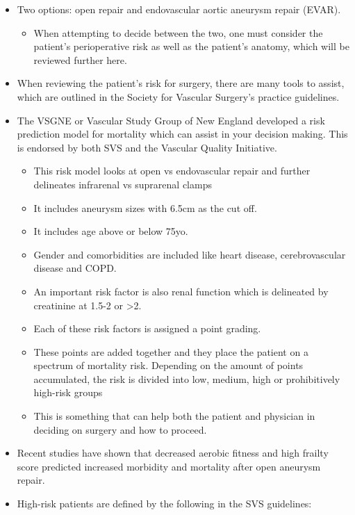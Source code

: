 \documentclass[
]{book}
\providecommand{\tightlist}{%
  \setlength{\itemsep}{0pt}\setlength{\parskip}{0pt}}
\begin{document}
\begin{itemize}
\item
  Two options: open repair and endovascular aortic aneurysm repair
  (EVAR).

  \begin{itemize}
  \tightlist
  \item
    When attempting to decide between the two, one must consider the
    patient's perioperative risk as well as the patient's anatomy,
    which will be reviewed further here.
  \end{itemize}
\item
  When reviewing the patient's risk for surgery, there are many tools
  to assist, which are outlined in the Society for Vascular Surgery's
  practice guidelines.
\item
  The VSGNE or Vascular Study Group of New England developed a risk
  prediction model for mortality which can assist in your decision
  making. This is endorsed by both SVS and the Vascular Quality
  Initiative.

  \begin{itemize}
  \item
    This risk model looks at open vs endovascular repair and further
    delineates infrarenal vs suprarenal clamps
  \item
    It includes aneurysm sizes with 6.5cm as the cut off.
  \item
    It includes age above or below 75yo.
  \item
    Gender and comorbidities are included like heart disease,
    cerebrovascular disease and COPD.
  \item
    An important risk factor is also renal function which is
    delineated by creatinine at 1.5-2 or \textgreater2.
  \item
    Each of these risk factors is assigned a point grading.
  \item
    These points are added together and they place the patient on a
    spectrum of mortality risk. Depending on the amount of points
    accumulated, the risk is divided into low, medium, high or
    prohibitively high-risk groups
  \item
    This is something that can help both the patient and physician
    in deciding on surgery and how to proceed.
  \end{itemize}
\item
  Recent studies have shown that decreased aerobic fitness and high
  frailty score predicted increased morbidity and mortality after open
  aneurysm repair.
\item
  High-risk patients are defined by the following in the SVS
  guidelines:


\end{itemize}
\end{document}
